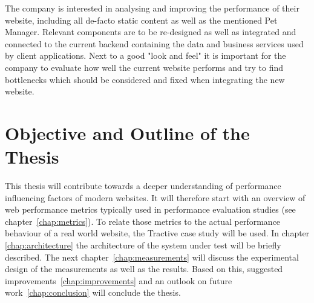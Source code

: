The company is interested in analysing and improving the performance of their website, including all de-facto static content as well as the mentioned Pet Manager. Relevant components are to be re-designed as well as integrated and connected to the current backend containing the data and business services used by client applications. Next to a good "look and feel" it is important for the company to evaluate how well the current website performs and try to find bottlenecks which should be considered and fixed when integrating the new website.     

\section{Objective and Outline of the Thesis}

This thesis will contribute towards a deeper understanding of performance influencing factors of modern websites.
It will therefore start with an overview of web performance metrics typically used in performance evaluation studies (see chapter~\ref{chap:metrics}).
To relate those metrics to the actual performance behaviour of a real world website, the Tractive case study will be used. 
In chapter \ref{chap:architecture} the architecture of the system under test will be briefly described.
The next chapter~\ref{chap:measurements} will discuss the  experimental design of the measurements as well as the results.
Based on this, suggested improvements~\ref{chap:improvements}  and an outlook on future work~\ref{chap:conclusion} will conclude the thesis.